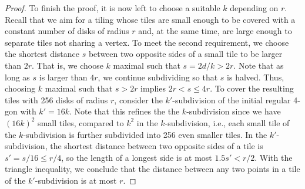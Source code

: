 \documentclass[11pt]{article}
\providecommand{\todo}[2][]{}
\newcommand{\Thomas}[1]{}
\renewcommand{\phi}{\varphi}
\begin{document}
\begin{proof}
%
%
    To finish the proof, it is now left to choose a suitable $ k $ depending on $ r $.
    Recall that we aim for a tiling whose tiles are small enough to be covered with a constant number of disks of radius $ r $ and, at the same time, are large enough to separate tiles not sharing a vertex.
    To meet the second requirement, we choose the shortest distance $ s $ between two opposite sides of a small tile to be larger than $ 2r $.
    That is, we choose $ k $ maximal such that $ s = 2d / k > 2r $.
    Note that as long as $s$ is larger than $4r$, we continue subdividing so that $s$ is halved.
    Thus, choosing $k$ maximal such that $s > 2r$ implies $2r < s \le 4r$.
%
    To cover the resulting tiles with 256 disks of radius $ r $, consider the $ k' $-subdivision of the initial regular 4-gon with $ k' = 16 k $.
    Note that this refines the the $ k $-subdivision since we have $ (16 k)^2 $ small tiles, compared to $ k^2 $ in the $ k $-subdivision, i.e., each small tile of the $ k $-subdivision is further subdivided into 256 even smaller tiles.
    In the $ k' $-subdivision, the shortest distance between two opposite sides of a tile is $ s' = s / 16 \leq r / 4 $, so the length of a longest side is at most $ 1.5 s' < r / 2 $.
    With the triangle inequality, we conclude that the distance between any two points in a tile of the $ k' $-subdivision is at most $ r $.

\end{proof}
\end{document}
